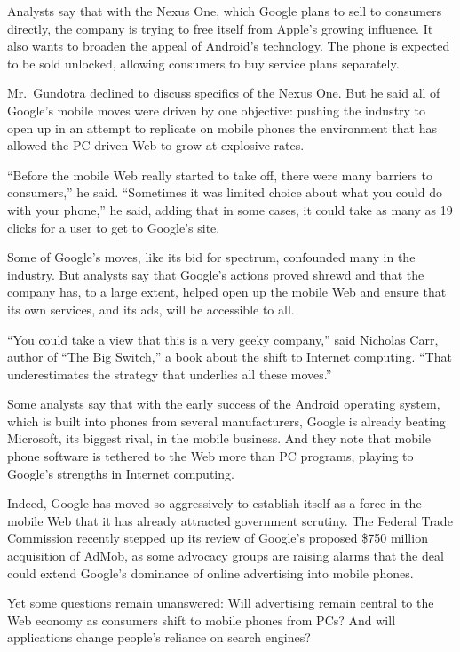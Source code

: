 ﻿\documentclass[12pt]{article}
\begin{document}
Analysts say that with the Nexus One, which Google plans to sell to consumers directly, the company
is trying to free itself from Apple's growing influence. It also wants to broaden the appeal of
Android's technology. The phone is expected to be sold unlocked, allowing consumers to buy service
plans separately.

Mr.~Gundotra declined to discuss specifics of the Nexus One. But he said all of Google's mobile
moves were driven by one objective: pushing the industry to open up in an attempt to replicate on
mobile phones the environment that has allowed the PC-driven Web to grow at explosive rates.

``Before the mobile Web really started to take off, there were many barriers to consumers,'' he
said. ``Sometimes it was limited choice about what you could do with your phone,'' he said, adding
that in some cases, it could take as many as 19 clicks for a user to get to Google's site.

Some of Google's moves, like its bid for spectrum, confounded many in the industry. But analysts say
that Google's actions proved shrewd and that the company has, to a large extent, helped open up the
mobile Web and ensure that its own services, and its ads, will be accessible to all.

``You could take a view that this is a very geeky company,'' said Nicholas Carr, author of ``The Big
Switch,'' a book about the shift to Internet computing. ``That underestimates the strategy that
underlies all these moves.''

Some analysts say that with the early success of the Android operating system, which is built into
phones from several manufacturers, Google is already beating Microsoft, its biggest rival, in the
mobile business. And they note that mobile phone software is tethered to the Web more than PC
programs, playing to Google's strengths in Internet computing.

Indeed, Google has moved so aggressively to establish itself as a force in the mobile Web that it
has already attracted government scrutiny. The Federal Trade Commission recently stepped up its
review of Google's proposed \$750 million acquisition of AdMob, as some advocacy groups are raising
alarms that the deal could extend Google's dominance of online advertising into mobile phones.

Yet some questions remain unanswered: Will advertising remain central to the Web economy as
consumers shift to mobile phones from PCs? And will applications change people's reliance on search
engines?
\end{document}
